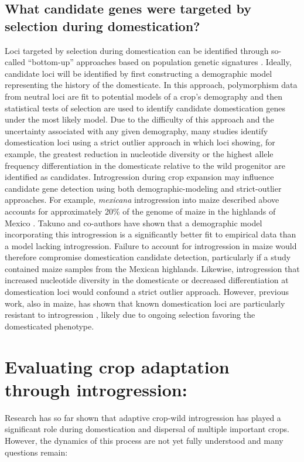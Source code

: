 \documentclass[11pt]{article}
\begin{document}
\subsection*{What candidate genes were targeted by selection during domestication?}
Loci targeted by selection during domestication can be identified through so-called ``bottom-up'' approaches based on population genetic signatures \cite{Ross-Ibarra2007}.
Ideally, candidate loci will be identified by first constructing a demographic model representing the history of the domesticate.
In this approach, polymorphism data from neutral loci are fit to potential models of a crop's demography and then statistical tests of selection are used to identify candidate domestication genes under the most likely model.
Due to the difficulty of this approach and the uncertainty associated with any given demography, many studies identify domestication loci using a strict outlier approach in which loci showing, for example, the greatest reduction in nucleotide diversity or the highest allele frequency differentiation in the domesticate relative to the wild progenitor are identified as candidates.
Introgression during crop expansion may influence candidate gene detection using both demographic-modeling and strict-outlier approaches.
For example, \emph{mexicana} introgression into maize described above accounts for approximately 20\% of the genome of maize in the highlands of Mexico \cite{vanHeerwaarden2011}.
Takuno and co-authors \cite{Takuno2015} have shown that a demographic model incorporating this introgression is a significantly better fit to empirical data than a model lacking introgression.
Failure to account for introgression in maize would therefore compromise domestication candidate detection, particularly if a study contained maize samples from the Mexican highlands.
Likewise, introgression that increased nucleotide diversity in the domesticate or decreased differentiation at domestication loci would confound a strict outlier approach.
However, previous work, also in maize, has shown that known domestication loci are particularly resistant to introgression \cite{Hufford2013}, likely due to ongoing selection favoring the domesticated phenotype.


\section*{Evaluating crop adaptation through introgression:}

Research has so far shown that adaptive crop-wild introgression has played a significant role during domestication and dispersal of multiple important crops.
However, the dynamics of this process are not yet fully understood and many questions remain:
\end{document}
